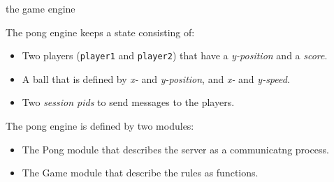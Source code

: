 \begin{frame}{the game engine}

  The pong engine keeps a state consisting of:

  \vspace{10pt} \pause
  
  \begin{itemize}
  \item Two players ({\tt player1} and {\tt player2}) that have a {\em y-position} and a {\em score}. \pause
  \item A ball that is defined by {\em x-} and {\em y-position}, and {\em x-} and {\em y-speed}.\pause
  \item Two {\em session pids} to send messages to the players. 
  \end{itemize}

  \vspace{10pt} \pause

  The pong engine is defined by two modules: 
  
  \vspace{10pt} \pause
  \begin{itemize}
  \item The Pong module that describes the server as a communicatng process. 
  \item The Game module that describe the rules as functions. 
  \end{itemize}
  

\end{frame}
  
  






